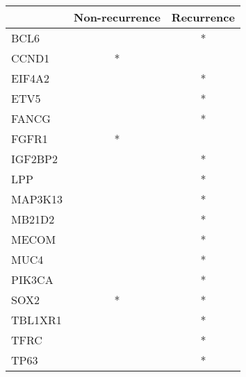 \begin{tabular}{lcc}
\toprule
{} & Non-recurrence & Recurrence \\
\midrule
BCL6    &                &          * \\
CCND1   &              * &            \\
EIF4A2  &                &          * \\
ETV5    &                &          * \\
FANCG   &                &          * \\
FGFR1   &              * &            \\
IGF2BP2 &                &          * \\
LPP     &                &          * \\
MAP3K13 &                &          * \\
MB21D2  &                &          * \\
MECOM   &                &          * \\
MUC4    &                &          * \\
PIK3CA  &                &          * \\
SOX2    &              * &          * \\
TBL1XR1 &                &          * \\
TFRC    &                &          * \\
TP63    &                &          * \\
\bottomrule
\end{tabular}

